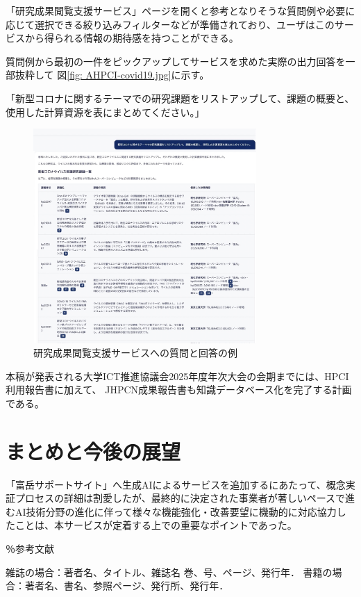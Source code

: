 \documentclass{jsaxiesproc}
\begin{document}
「研究成果閲覧支援サービス」ページを開くと参考となりそうな質問例や必要に応じて選択できる絞り込みフィルターなどが準備されており、ユーザはこのサービスから得られる情報の期待感を持つことができる。

質問例から最初の一件をピックアップしてサービスを求めた実際の出力回答を一部抜粋して
図\ref{fig: AHPCI-covid19.jpg}に示す。

「新型コロナに関するテーマでの研究課題をリストアップして、課題の概要と、使用した計算資源を表にまとめてください。」

\begin{figure}[htbp]
\includegraphics[width=8.5cm]{figs/HPCI-covid19.jpg}
\caption{研究成果閲覧支援サービスへの質問と回答の例}
\label{fig:AHPCI-covid19.jpg}
\end{figure}



本稿が発表される大学ICT推進協議会2025年度年次大会の会期までには、HPCI利用報告書に加えて、
JHPCN成果報告書も知識データベース化を完了する計画である。



\section{まとめと今後の展望}
「富岳サポートサイト」へ生成AIによるサービスを追加するにあたって、概念実証プロセスの詳細は割愛したが、最終的に決定された事業者が著しいペースで進むAI技術分野の進化に伴って様々な機能強化・改善要望に機動的に対応協力したことは、本サービスが定着する上での重要なポイントであった。


％参考文献
\begin{thebibliography}{99}
	 雑誌の場合：著者名、タイトル、雑誌名 巻、号、ページ、発行年．
	 書籍の場合：著者名、書名、参照ページ、発行所、発行年．
\end{thebibliography}
\end{document}
